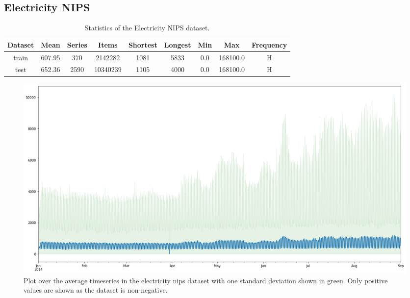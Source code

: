 \clearpage
\subsection{Electricity NIPS}
 \begin{table}[htb]
    \begin{tabular}{||c | c c c c c c c c ||} 
        \hline
       Dataset & Mean & Series & Items & Shortest & Longest & Min & Max & Frequency\\ [0.5ex] 
        \hline\hline
        train & 607.95 & 370 & 2142282 & 1081 & 5833 & 0.0 & 168100.0 & H\\ 
        \hline
        test & 652.36 & 2590 & 10340239 & 1105 & 4000 & 0.0 & 168100.0 & H\\
        \hline
    \end{tabular}
    \caption{Statistics of the Electricity NIPS dataset.}
\end{table}

\begin{figure}[htb]
    \centering
      \includegraphics[width=\linewidth]{4_designing/figures/electricity_nips_plot.png}
      \caption{Plot over the average timeseries in the electricity nips dataset with one standard deviation shown in green. Only positive values are shown as the dataset is non-negative.}
      \label{fig:electricity_nips_plot}
    \endminipage\hfill
\end{figure}

